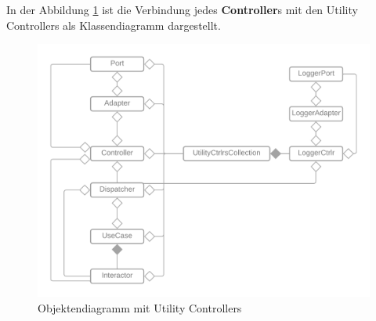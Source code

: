 In der Abbildung \ref{fig:CDControllerWithUtility} ist die Verbindung jedes \textbf{Controller}s mit den Utility Controllers als Klassendiagramm dargestellt.
    
\begin{figure}[H]
    \centering
    \includegraphics[width=12cm]{./images/KlassendiagramMitUtilityControllers.png}
     \caption[Objektendiagramm mit Utility Controllers]{Objektendiagramm mit Utility Controllers \footnotemark}
     \label{fig:CDControllerWithUtility}
\end{figure}
